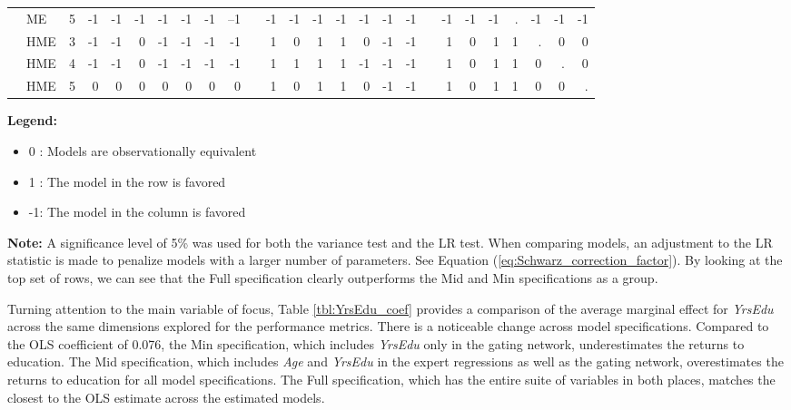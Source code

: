 \documentclass[12pt]{article}
\theoremstyle{definition}
\begin{document}
\begin{landscape}
\begin{table}[t!]
\begin{threeparttable}
{\begin{tabular}[r]{l l l r r r r r r r r r r r r r r r r r r r r r r r}
         & ME  & 5       & -1  & -1  & -1  & -1  & -1   & -1   & --1          && -1  &  -1 & -1  & -1  & -1   & -1   &  -1          && -1  & -1  & -1  &  .  & -1   & -1   & -1       \\
         & HME & 3       & -1  & -1  &  0  & -1  & -1   & -1   &  -1          &&  1  &   0 &  1  &  1  &  0   & -1   &  -1          &&  1  &  0  &  1  &  1  &  .   &  0   &  0       \\
         & HME & 4       & -1  & -1  &  0  & -1  & -1   & -1   &  -1          &&  1  &   1 &  1  &  1  & -1   & -1   &  -1          &&  1  &  0  &  1  &  1  &  0   &  .   &  0       \\
         & HME & 5       &  0  &  0  &  0  &  0  &  0   &  0   &   0          &&  1  &   0 &  1  &  1  &  0   & -1   &  -1          &&  1  &  0  &  1  &  1  &  0   &  0   &  .       \\
        \cmidrule(l){1-26}
    \end{tabular}
    }
    \begin{tablenotes}
      \item{\footnotesize \textbf{Legend:}
      \begin{itemize}
        \item 0 :  Models are observationally equivalent
        \item 1 :  The model in the row is favored
        \item -1: The model in the column is favored
      \end{itemize}
      }
      \item{\footnotesize \textbf{Note:}
      A significance level of 5\% was used for both the variance test and the LR test. When comparing models, an adjustment to the LR statistic is made to penalize models with a larger number of parameters. See Equation (\ref{eq:Schwarz_correction_factor}). By looking at the top set of rows, we can see that the Full specification clearly outperforms the Mid and Min specifications as a group.}
    \end{tablenotes} \label{tbl:voung_comparison}
  \end{threeparttable}
\end{table}
\end{landscape}


Turning attention to the main variable of focus, Table \ref{tbl:YrsEdu_coef} provides a comparison of the average marginal effect for \textit{YrsEdu} across the same dimensions explored for the performance metrics. There is a noticeable change across model specifications. Compared to the OLS coefficient of 0.076, the Min specification, which includes \textit{YrsEdu} only in the gating network, underestimates the returns to education. The Mid specification, which includes \textit{Age} and \textit{YrsEdu} in the expert regressions as well as the gating network, overestimates the returns to education for all model specifications. The Full specification, which has the entire suite of variables in both places, matches the closest to the OLS estimate across the estimated models.
\end{document}
